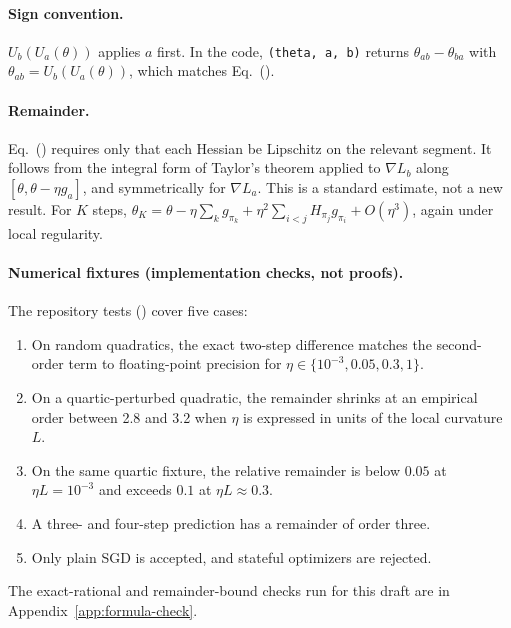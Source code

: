 \paragraph{Sign convention.} $U_b(U_a(\theta))$ applies $a$ first. In the code,
\texttt{(theta, a, b)} returns $\theta_{ab}-\theta_{ba}$ with
$\theta_{ab}=U_b(U_a(\theta))$, which matches Eq.~().

\paragraph{Remainder.} Eq.~() requires only that each Hessian be Lipschitz on the relevant
segment. It follows from the integral form of Taylor's theorem applied to $\nabla L_b$ along
$[\theta,\theta-\eta g_a]$, and symmetrically for $\nabla L_a$. This is a standard estimate, not a new result.
For $K$ steps, $\theta_K=\theta-\eta\sum_k g_{\pi_k}+\eta^2\sum_{i<j}H_{\pi_j}g_{\pi_i}+O(\eta^3)$, again under
local regularity.

\paragraph{Numerical fixtures (implementation checks, not proofs).} The repository tests
() cover five cases:
\begin{enumerate}
\item On random quadratics, the exact two-step difference matches the second-order term to floating-point
precision for $\eta\in\{10^{-3},0.05,0.3,1\}$.
\item On a quartic-perturbed quadratic, the remainder shrinks at an empirical order between 2.8 and 3.2 when
$\eta$ is expressed in units of the local curvature $L$.
\item On the same quartic fixture, the relative remainder is below $0.05$ at $\eta L=10^{-3}$ and exceeds
$0.1$ at $\eta L\approx 0.3$.
\item A three- and four-step prediction has a remainder of order three.
\item Only plain SGD is accepted, and stateful optimizers are rejected.
\end{enumerate}
The exact-rational and remainder-bound checks run for this draft are in Appendix~\ref{app:formula-check}.

